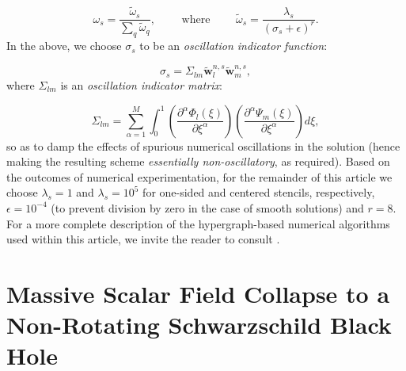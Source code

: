 \documentclass{article}
\begin{document}
\begin{equation}
\omega_s = \frac{\tilde{\omega}_s}{\sum\limits_q \tilde{\omega}_q}, \qquad \text{ where } \qquad \tilde{\omega}_s = \frac{\lambda_s}{\left( \sigma_s + \epsilon \right)^r}.
\end{equation}
In the above, we choose ${\sigma_s}$ to be an \textit{oscillation indicator function}:

\begin{equation}
\sigma_s = \Sigma_{l m} \tilde{\mathbf{w}}_{l}^{n, s} \tilde{\mathbf{w}}_{m}^{n, s},
\end{equation}
where ${\Sigma_{l m}}$ is an \textit{oscillation indicator matrix}\cite{dumbser}:

\begin{equation}
\Sigma_{l m} = \sum_{\alpha = 1}^{M} \int_{0}^{1} \left( \frac{\partial^{\alpha} \Phi_l \left( \xi \right)}{\partial \xi^{\alpha}} \right) \left( \frac{\partial^{\alpha} \Psi_m \left( \xi \right)}{\partial \xi^{\alpha}} \right) d \xi,
\end{equation}
so as to damp the effects of spurious numerical oscillations in the solution (hence making the resulting scheme \textit{essentially non-oscillatory}, as required). Based on the outcomes of numerical experimentation, for the remainder of this article we choose ${\lambda_s = 1}$ and ${\lambda_s = 10^5}$ for one-sided and centered stencils, respectively, ${\epsilon = 10^{-4}}$ (to prevent division by zero in the case of smooth solutions) and ${r = 8}$. For a more complete description of the hypergraph-based numerical algorithms used within this article, we invite the reader to consult \cite{gorard4}.

\section{Massive Scalar Field Collapse to a Non-Rotating Schwarzschild Black Hole}
\label{sec:Section2}
\end{document}
